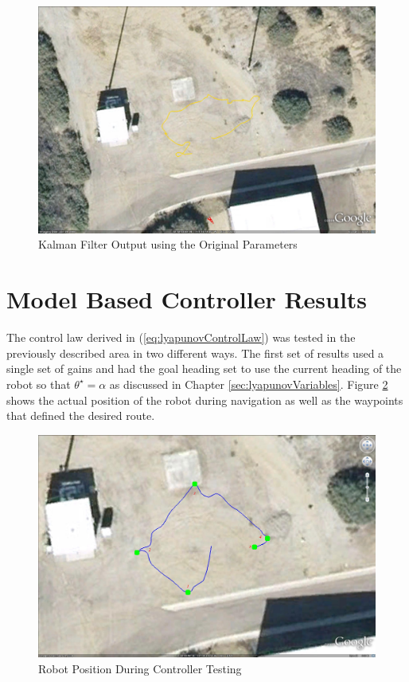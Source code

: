 \begin{figure}[ht!]
	\centering
	\includegraphics[width=.95\textwidth]{images/kfPlainDataFirstAttempt}
	\caption{Kalman Filter Output using the Original Parameters}
	\label{fig:kfPlainDataFirstAttempt}
\end{figure}

\section{Model Based Controller Results}
\label{sec:lyapunovResults}
The control law derived in (\ref{eq:lyapunovControlLaw}) was tested in the previously described area in two different ways. The first set of results used a single set of gains and had the goal heading set to use the current heading of the robot so that $\theta^\star=\alpha$ as discussed in Chapter \ref{sec:lyapunovVariables}. Figure \ref{fig:resultsLyapunovGEKF} shows the actual position of the robot during navigation as well as the waypoints that defined the desired route.

\begin{figure}[ht!]
	\centering
	\includegraphics[width=.5\textwidth]{images/20100918_1717_GE_KF_waypts}
	\caption{Robot Position During Controller Testing}
	\label{fig:resultsLyapunovGEKF}
\end{figure}

